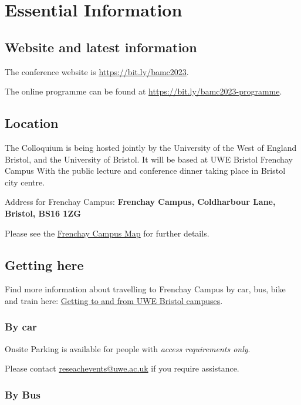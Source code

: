 \documentclass[12pt,a4paper]{article}
\begin{document}
\section{Essential Information}

\subsection{Website and latest information}

The conference website is \href{https://bit.ly/bamc2023}{https://bit.ly/bamc2023}.

The online programme can be found at \href{https://bit.ly/bamc2023-programme}{https://bit.ly/bamc2023-programme}.

\subsection{Location}

The Colloquium is being hosted jointly by the University of the West of England Bristol, and the University of Bristol. It will be based at UWE Bristol Frenchay Campus With the public lecture and conference dinner taking place in Bristol city centre.

Address for Frenchay Campus: \textbf{Frenchay Campus, Coldharbour Lane, Bristol, BS16 1ZG}

Please see the \href{https://www.uwe.ac.uk/life/campus-and-facilities/frenchay-campus/frenchay-campus-map}{Frenchay Campus Map} for further details.

\subsection{Getting here}

Find more information about travelling to Frenchay Campus by car, bus, bike and train here: \href{https://www.uwe.ac.uk/life/campus-and-facilities/getting-to-and-from-uwe}{Getting to and from UWE Bristol campuses}.

\subsubsection{By car}

Onsite Parking is available for people with \emph{access requirements only}. 

Please contact \href{mailto:reseachevents@uwe.ac.uk}{reseachevents@uwe.ac.uk} if you require assistance.

\subsubsection{By Bus}
\end{document}
